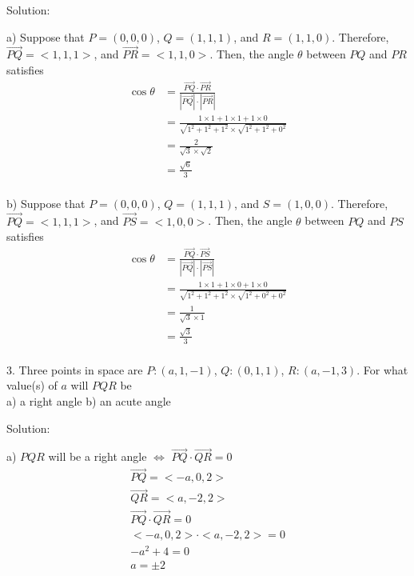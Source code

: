\documentclass{article}
\begin{document}
Solution:

a) Suppose that $P = (0, 0, 0)$, $Q = (1, 1, 1)$, and $R = (1, 1, 0)$. 
Therefore, $\vec{PQ} = <1, 1, 1>$, and $\vec{PR} = <1, 1, 0>$. Then, the angle
$\theta$ between $PQ$ and $PR$ satisfies
\[
  \begin{split}
    \cos\theta &= \frac{\vec{PQ} \cdot \vec{PR}}{|\vec{PQ}| \cdot |\vec{PR}|} \\
               &= \frac{1 \times 1 + 1 \times 1 + 1 \times 0}{\sqrt{1^2 + 1^2 + 1^2} \times \sqrt{1^2 + 1^2 + 0^2}} \\
               &= \frac{2}{\sqrt{3} \times \sqrt{2}} \\
               &= \frac{\sqrt{6}}{3} \\
  \end{split}
\]

b) Suppose that $P = (0, 0, 0)$, $Q = (1, 1, 1)$, and $S = (1, 0, 0)$. 
Therefore, $\vec{PQ} = <1, 1, 1>$, and $\vec{PS} = <1, 0, 0>$. Then, the angle
$\theta$ between $PQ$ and $PS$ satisfies
\[
  \begin{split}
    \cos\theta &= \frac{\vec{PQ} \cdot \vec{PS}}{|\vec{PQ}| \cdot |\vec{PS}|} \\
               &= \frac{1 \times 1 + 1 \times 0 + 1 \times 0}{\sqrt{1^2 + 1^2 + 1^2} \times \sqrt{1^2 + 0^2 + 0^2}} \\
               &= \frac{1}{\sqrt{3} \times 1} \\
               &= \frac{\sqrt{3}}{3} \\
  \end{split}
\]

3. Three points in space are $P:(a,1,-1)$, $Q:(0,1,1)$, $R:(a,-1,3)$. For what
value(s) of $a$ will $PQR$ be\\
a) a right angle \hspace{10px} b) an acute angle

Solution:

a) $PQR$ will be a right angle $\iff$ $\vec{PQ} \cdot \vec{QR} = 0$
\begin{gather*}
  \vec{PQ} = <-a, 0, 2> \\
  \vec{QR} = <a, -2, 2> \\
  \vec{PQ} \cdot \vec{QR} = 0 \\
  <-a, 0, 2> \cdot <a, -2, 2> = 0 \\
  -a^2 + 4 = 0 \\
  a = \pm 2 \\
\end{gather*}
\end{document}
